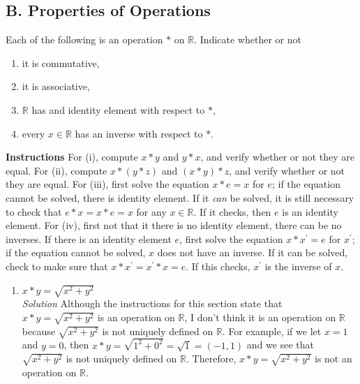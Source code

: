 \documentclass[12pt]{article}
\begin{document}
\begin{flushleft}
      \section*{B. Properties of Operations}
        Each of the following is an operation $*$ on $\mathbb{R}$. Indicate whether or not
        \renewcommand{\theenumi}{(\roman{enumi})}
        \begin{enumerate}
          \item it is commutative,
          \item it is associative,
          \item $\mathbb{R}$ has and identity element with respect to $*$,
          \item every $x \in \mathbb{R}$ has an inverse with respect to $*$.
        \end{enumerate}
        \textbf{Instructions} For (i), compute $x * y$ and $y * x$, and verify whether or not they are equal. 
        For (ii), compute $x * (y * z)$ and $(x * y) * z$, and verify whether or not they are equal. For (iii), 
        first solve the equation $x * e = x$ for $e$; if the equation cannot be solved, there is identity element. 
        If it \textit{can} be solved, it is still necessary to check that $e * x = x * e = x$ for any $x \in \mathbb{R}$. 
        If it checks, then $e$ is an identity element. For (iv), first not that it there is no identity element, there 
        can be no inverses. If there is an identity element $e$, first solve the equation $x * x^{'} = e$ for
        $x^{'}$; if the equation cannot be solved, $x$ does not have an inverse. If it can be solved, check to 
        make sure that $x * x^{'} = x^{'} * x = e$. If this checks, $x^{'}$ is the inverse of $x$.
        \renewcommand{\theenumi}{\arabic{enumi})}
        \begin{enumerate}
          \item $x * y = \sqrt{x^2 + y^2}$ \\
            \medskip
            \textit{Solution}
            Although the instructions for this section state that $x * y = \sqrt{x^2 + y^2}$ is an operation
            on $\mathbb{R}$, I don't think it is an operation on  $\mathbb{R}$ because $\sqrt{x^2 + y^2}$ is 
            not uniquely defined on $\mathbb{R}$. For example, if we let $x = 1$ and $y = 0$, then 
            $x * y = \sqrt{1^2 + 0^2} = \sqrt{1} = (-1, 1)$ and we see that $\sqrt{x^2 + y^2}$ is not uniquely 
            defined on $\mathbb{R}$. Therefore, $x * y = \sqrt{x^2 + y^2}$ is not an operation on $\mathbb{R}$. \\

\end{enumerate}
\end{flushleft}
\end{document}
